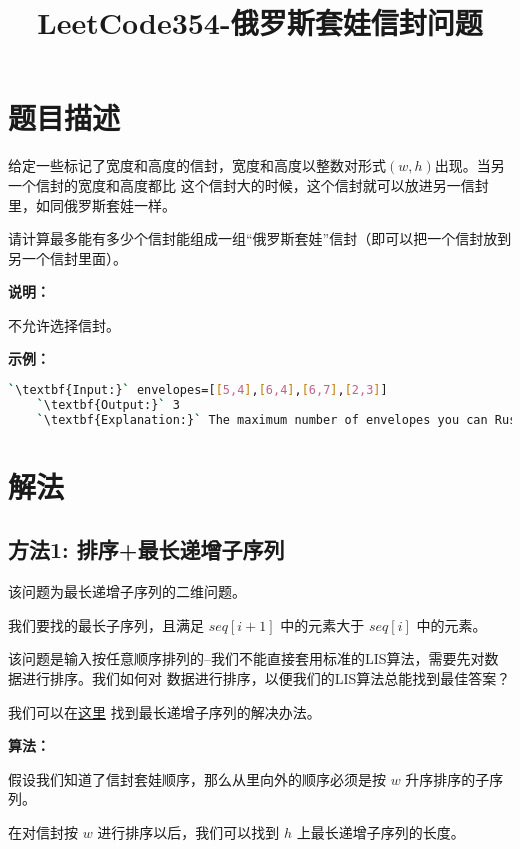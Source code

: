 \documentclass[a4paper]{article}
\title{LeetCode354-俄罗斯套娃信封问题}
\begin{document}
\maketitle

\section{题目描述}
给定一些标记了宽度和高度的信封，宽度和高度以整数对形式$(w,h)$出现。当另一个信封的宽度和高度都比
这个信封大的时候，这个信封就可以放进另一信封里，如同俄罗斯套娃一样。

请计算最多能有多少个信封能组成一组“俄罗斯套娃”信封（即可以把一个信封放到另一个信封里面）。

\noindent
\textbf{说明：}

不允许选择信封。

\noindent
\textbf{示例：}

\begin{lstlisting}[language=bash]
    `\textbf{Input:}` envelopes=[[5,4],[6,4],[6,7],[2,3]]
    `\textbf{Output:}` 3
    `\textbf{Explanation:}` The maximum number of envelopes you can Russian doll is 3 ([2,3] => [5,4] => [6,7]).
\end{lstlisting}



\section{解法}

\subsection{方法1: 排序+最长递增子序列}

该问题为最长递增子序列的二维问题。

我们要找的最长子序列，且满足 $seq[i+1]$ 中的元素大于 $seq[i]$ 中的元素。

该问题是输入按任意顺序排列的--我们不能直接套用标准的LIS算法，需要先对数据进行排序。我们如何对
数据进行排序，以便我们的LIS算法总能找到最佳答案？

我们可以在\href{https://leetcode-cn.com/problems/longest-increasing-subsequence/
    ?utm_source=LCUS&utm_medium=ip_redirect_q_uns&utm_campaign=transfer2china}{这里}
找到最长递增子序列的解决办法。

\noindent
\textbf{算法：}

假设我们知道了信封套娃顺序，那么从里向外的顺序必须是按 $w$ 升序排序的子序列。

在对信封按 $w$ 进行排序以后，我们可以找到 $h$ 上最长递增子序列的长度。
\end{document}
